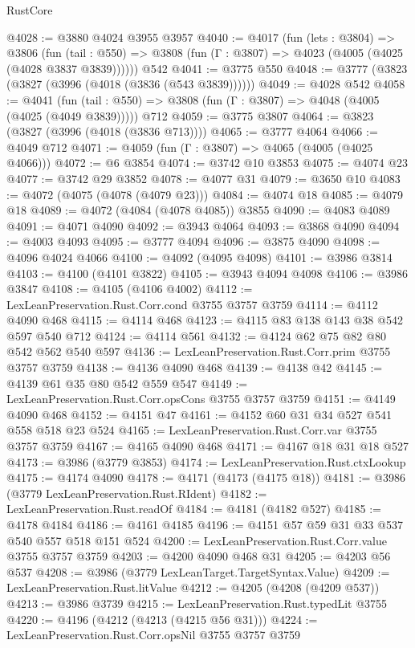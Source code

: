 \begin{lexlean}{RustCore}
\begin{coremodule}
@4028 := @3880 @4024 @3955 @3957
@4040 := @4017
    (fun (lets : @3804) =>
    @3806
      (fun (tail : @550) => @3808 (fun (Γ : @3807) => @4023 (@4005 (@4025 (@4028 @3837 @3839))))))
    @542
@4041 := @3775 @550
@4048 := @3777 (@3823 (@3827 (@3996 (@4018 (@3836 (@543 @3839))))))
@4049 := @4028 @542
@4058 := @4041
    (fun (tail : @550) => @3808 (fun (Γ : @3807) => @4048 (@4005 (@4025 (@4049 @3839)))))
    @712
@4059 := @3775 @3807
@4064 := @3823 (@3827 (@3996 (@4018 (@3836 @713))))
@4065 := @3777 @4064
@4066 := @4049 @712
@4071 := @4059 (fun (Γ : @3807) => @4065 (@4005 (@4025 @4066)))
@4072 := @6 @3854
@4074 := @3742 @10 @3853
@4075 := @4074 @23
@4077 := @3742 @29 @3852
@4078 := @4077 @31
@4079 := @3650 @10
@4083 := @4072 (@4075 (@4078 (@4079 @23)))
@4084 := @4074 @18
@4085 := @4079 @18
@4089 := @4072 (@4084 (@4078 @4085)) @3855
@4090 := @4083 @4089
@4091 := @4071 @4090
@4092 := @3943 @4064
@4093 := @3868 @4090
@4094 := @4003 @4093
@4095 := @3777 @4094
@4096 := @3875 @4090
@4098 := @4096 @4024 @4066
@4100 := @4092 (@4095 @4098)
@4101 := @3986 @3814
@4103 := @4100 (@4101 @3822)
@4105 := @3943 @4094 @4098
@4106 := @3986 @3847
@4108 := @4105 (@4106 @4002)
@4112 := LexLeanPreservation.Rust.Corr.cond @3755 @3757 @3759
@4114 := @4112 @4090 @468
@4115 := @4114 @468
@4123 := @4115 @83 @138 @143 @38 @542 @597 @540 @712
@4124 := @4114 @561
@4132 := @4124 @62 @75 @82 @80 @542 @562 @540 @597
@4136 := LexLeanPreservation.Rust.Corr.prim @3755 @3757 @3759
@4138 := @4136 @4090 @468
@4139 := @4138 @42
@4145 := @4139 @61 @35 @80 @542 @559 @547
@4149 := LexLeanPreservation.Rust.Corr.opsCons @3755 @3757 @3759
@4151 := @4149 @4090 @468
@4152 := @4151 @47
@4161 := @4152 @60 @31 @34 @527 @541 @558 @518 @23 @524
@4165 := LexLeanPreservation.Rust.Corr.var @3755 @3757 @3759
@4167 := @4165 @4090 @468
@4171 := @4167 @18 @31 @18 @527
@4173 := @3986 (@3779 @3853)
@4174 := LexLeanPreservation.Rust.ctxLookup
@4175 := @4174 @4090
@4178 := @4171 (@4173 (@4175 @18))
@4181 := @3986 (@3779 LexLeanPreservation.Rust.RIdent)
@4182 := LexLeanPreservation.Rust.readOf
@4184 := @4181 (@4182 @527)
@4185 := @4178 @4184
@4186 := @4161 @4185
@4196 := @4151 @57 @59 @31 @33 @537 @540 @557 @518 @151 @524
@4200 := LexLeanPreservation.Rust.Corr.value @3755 @3757 @3759
@4203 := @4200 @4090 @468 @31
@4205 := @4203 @56 @537
@4208 := @3986 (@3779 LexLeanTarget.TargetSyntax.Value)
@4209 := LexLeanPreservation.Rust.litValue
@4212 := @4205 (@4208 (@4209 @537))
@4213 := @3986 @3739
@4215 := LexLeanPreservation.Rust.typedLit @3755
@4220 := @4196 (@4212 (@4213 (@4215 @56 @31)))
@4224 := LexLeanPreservation.Rust.Corr.opsNil @3755 @3757 @3759

\end{coremodule}
\end{lexlean}
